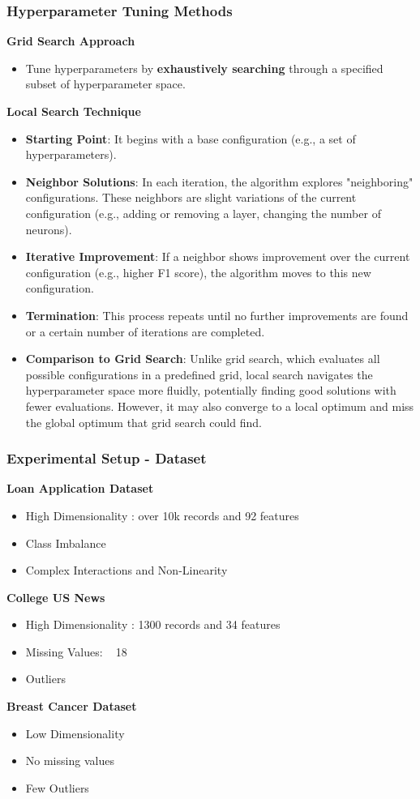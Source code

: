 \documentclass[10pt]{beamer}
\begin{document}
\begin{frame}
\frametitle{Hyperparameter Tuning Methods}
\footnotesize
\textbf{Grid Search Approach}
\begin{itemize}
\item Tune hyperparameters by \textbf{exhaustively searching} through a specified subset of hyperparameter space.
\end{itemize}
\textbf{Local Search Technique}
\begin{itemize}
\item \textbf{Starting Point}: It begins with a base configuration (e.g., a set of hyperparameters).
\item \textbf{Neighbor Solutions}: In each iteration, the algorithm explores "neighboring" configurations. These neighbors are slight variations of the current configuration (e.g., adding or removing a layer, changing the number of neurons).
\item \textbf{Iterative Improvement}: If a neighbor shows improvement over the current configuration (e.g., higher F1 score), the algorithm moves to this new configuration.
\item \textbf{Termination}: This process repeats until no further improvements are found or a certain number of iterations are completed.
\item \textbf{Comparison to Grid Search}: Unlike grid search, which evaluates all possible configurations in a predefined grid, local search navigates the hyperparameter space more fluidly, potentially finding good solutions with fewer evaluations. However, it may also converge to a local optimum and miss the global optimum that grid search could find.
\end{itemize}
\end{frame}

\begin{frame}
\frametitle{Experimental Setup - Dataset}
\textbf{Loan Application Dataset}
\begin{itemize}
\item High Dimensionality : over 10k records and 92 features
\item Class Imbalance
\item Complex Interactions and Non-Linearity
\end{itemize}

\textbf{College US News}
\begin{itemize}
\item High Dimensionality : 1300 records and 34 features 
\item Missing Values: ~ 18%
\item Outliers
\end{itemize}

\textbf{Breast Cancer Dataset}
\begin{itemize}
\item Low Dimensionality
\item No missing values
\item Few Outliers
\end{itemize}
\end{frame}
\end{document}

